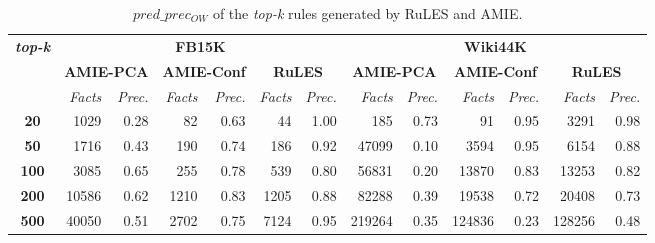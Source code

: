 \begin{table}[t]
\scriptsize
\centering
\begin{tabular}{c|r r|r r|r r|r r|r r|r r}

 \multirow{3}{*}{\textbf{\textit{top-k}}}&\multicolumn{6}{|c}{\textbf{FB15K}} & \multicolumn{6}{|c}{\textbf{Wiki44K}}\\
 \cmidrule{2-13}&\multicolumn{2}{|c}{\textbf{AMIE-PCA}}&\multicolumn{2}{|c|}{\textbf{AMIE-Conf}}&\multicolumn{2}{|c}{\textbf{RuLES}}&\multicolumn{2}{|c}{\textbf{AMIE-PCA}}&\multicolumn{2}{|c}{\textbf{AMIE-Conf}}&\multicolumn{2}{|c}{\textbf{RuLES}} \\
 & \textit{Facts} & \textit{Prec.} & \textit{Facts} & \textit{Prec.} & \textit{Facts} & \textit{Prec.} &\textit{Facts} & \textit{Prec.} &\textit{Facts} & \textit{Prec.} &\textit{Facts} & \textit{Prec.} \\
 \midrule
 \textbf{20} & 1029 & 0.28 & 82 & 0.63 & 44 & 1.00 & 185 & 0.73 & 91 & 0.95 & 3291 & 0.98\\
 \textbf{50} & 1716 & 0.43 & 190 & 0.74 & 186 & 0.92 & 47099 & 0.10 & 3594 & 0.95 & 6154 & 0.88 \\
\textbf{100} & 3085 & 0.65 & 255 & 0.78 & 539 & 0.80 & 56831 & 0.20 & 13870 & 0.83 & 13253 & 0.82 \\
\textbf{200} & 10586 & 0.62 & 1210 & 0.83 & 1205 & 0.88 & 82288 & 0.39 & 19538 & 0.72 & 20408 & 0.73 \\
\textbf{500} & 40050 & 0.51 & 2702 & 0.75 & 7124 & 0.95 & 219264 & 0.35 & 124836 & 0.23 & 128256 & 0.48 \\
 \bottomrule
\end{tabular}
\caption{$pred\_prec_{OW}$ of the \textit{top-k} rules generated by RuLES and AMIE.}
\label{table:amie_vs_RuLES}
\vspace*{-3mm}
\end{table}
